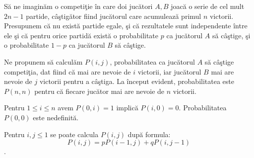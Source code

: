 \documentclass{article}
\begin{document}
Să ne imaginăm o competiţie în care doi jucători $A, B$ joacă o serie de cel mult $2n-1$ partide, câştigător fiind jucătorul care acumulează primul $n$ victorii. Presupunem că nu există partide egale, şi că rezultatele sunt independente între ele şi că pentru orice partidă există o probabilitate $p$ ca jucătorul $A$ să câştige, şi o probabilitate $1-p$ ca jucătorul $B$ să câştige.

Ne propunem să calculăm $P(i, j)$, probabilitatea ca jucătorul $A$ să câştige competiţia, dat fiind că mai are nevoie de $i$ victorii, iar jucătorul $B$ mai are nevoie de $j$ victorii pentru a câştiga. La început evident, probabilitatea este $P(n, n)$ pentru că fiecare jucător mai are nevoie de $n$ victorii.

Pentru $1 \leq i \leq n$ avem $P(0, i) = 1$ implică $P(i, 0) = 0$. Probabilitatea $P(0, 0)$ este nedefinită.

Pentru $i, j \leq 1$ se poate calcula $P(i, j)$ după formula: $$P(i, j) = pP(i - 1, j) + qP(i, j-1)$$.
\end{document}
